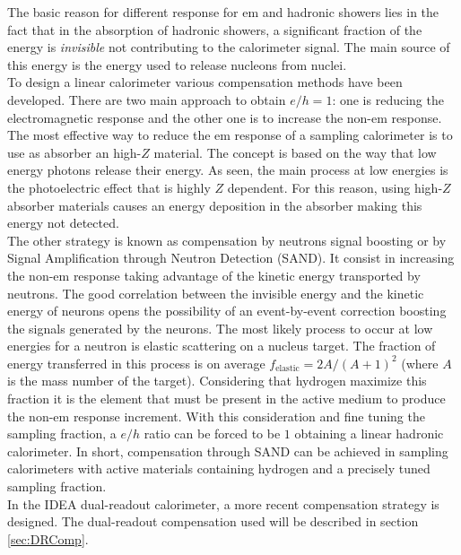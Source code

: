 The basic reason for different response for em and hadronic showers lies in the fact that in the absorption of hadronic showers, a significant fraction of the energy is \textit{invisible} not contributing to the calorimeter signal. The main source of this energy is the energy used to release nucleons from nuclei.\\
To design a linear calorimeter various compensation methods have been developed. There are two main approach to obtain $e/h = 1$: one is reducing the electromagnetic response and the other one is to increase the non-em response.\\
The most effective way to reduce the em response of a sampling calorimeter is to use as absorber an high-$Z$ material. The concept is based on the way that low energy photons release their energy. As seen, the main process at low energies is the photoelectric effect that is highly $Z$ dependent. For this reason, using high-$Z$ absorber materials causes an energy deposition in the absorber making this energy not detected.\\
The other strategy is known as compensation by neutrons signal boosting or by Signal Amplification through Neutron Detection (SAND). It consist in increasing the non-em response taking advantage of the kinetic energy transported by neutrons. The good correlation between the invisible energy and the kinetic energy of neurons opens the possibility of an event-by-event correction boosting the signals generated by the neurons. The most likely process to occur at low energies for a neutron is elastic scattering on a nucleus target. The fraction of energy transferred in this process is on average $f_{\text{elastic}} = 2A / (A +1)^2$ (where $A$ is the mass number of the target). Considering that hydrogen maximize this fraction it is the element that must be present in the active medium to produce the non-em response increment. With this consideration and fine tuning the sampling fraction, a $e/h$ ratio can be forced to be $1$ obtaining a linear hadronic calorimeter.
In short, compensation through SAND can be achieved in sampling calorimeters with active materials containing hydrogen and a precisely tuned sampling fraction.\\
In the IDEA dual-readout calorimeter, a more recent compensation strategy is designed. The dual-readout compensation used will be described in section \ref{sec:DRComp}.

